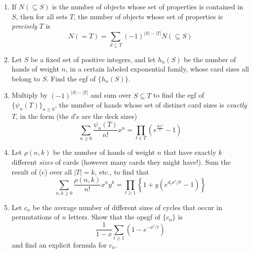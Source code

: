\begin{exercise}
    \begin{enumerate}[label=(\alph*)]
        \item If $N(\subseteq S)$ is the number of objects whose set of properties is contained in $S$, then for all sets $T$, the number of objects whose set of properties is \emph{precisely} $T$ is
        \[
            N(=T) = \sum_{S\subseteq T} (-1)^{|S| - |T|} N(\subseteq S)
        \]
        \item Let $S$ be a fixed set of positive integers, and let $h_n(S)$ be the number of hands of weight $n$, in a certain labeled exponential family, whose card sizes all belong to $S$. Find the egf of $\{h_n(S)\}$.
        \item Multiply by $(-1)^{|S|-|T|}$ and sum over $S\subseteq T$ to find the egf of $\{\psi_n(T)\}_{n\geq0}$, the number of hands whose set of distinct card sizes is \emph{exactly} $T$, in the form (the $d$'s are the deck sizes)
        \[
            \sum_{n\geq0} \frac{\psi_n(T)}{n!} x^n = \prod_{t\in T} \left(e^{\frac{d_tx^t}{t!}} - 1 \right)
        \]
        \item Let $\rho(n,k)$ be the number of hands of weight $n$ that have exactly $k$ different \emph{sizes} of cards (however many cards they might have!). Sum the result of (c) over all $|T|=k$, etc., to find that 
        \[
            \sum_{n,k\geq0} \frac{\rho(n,k)}{n!} x^n y^k = \prod_{t\geq1}\left\{1+y\left(e^{d_tx^t/t!}-1\right)\right\}
        \]
        \item Let $c_n$ be the average number of different sizes of cycles that occur in permutations of $n$ letters. Show that the opsgf of $\{c_n\}$ is 
        \[
            \frac{1}{1-x}\sum_{t\geq1} \left(1-e^{-x^t/t}\right)
        \]
        and find an explicit formula for $c_n$.
    \end{enumerate}
\end{exercise}
